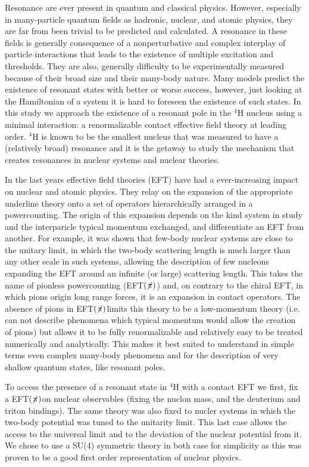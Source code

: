 \documentclass[aps,onecolumn,preprintnumbers,amsmath,amssymb,nofootinbib,superscriptaddress,notitlepage]{revtex4-1}
\newcommand{\eftnopi}{\mbox{EFT$(\not \! \pi)$}}
\begin{document}
Resonance are ever present in quantum and classical physics.
However, especially in many-particle quantum fields as hadronic, nuclear, and atomic physics, they are far from been trivial to be predicted and calculated. 
A resonance in these fields is generally consequence of a nonperturbative and complex interplay of particle interactions that leads to the existence of multiple excitation and thresholds. 
They are also, generally difficulty to be experimentally measured because of their broad size and their many-body nature. 
Many models predict the existence of resonant states with better or worse success, however, just looking at the Hamiltonian of a system it is hard to foreseen the existence of such states.
In this study we approach the existence of a resonant pole in the $^4$H nucleus using a minimal interaction: a renormalizable contact effective field theory at leading order.
$^4$H is known to be the smallest nucleus that was measured to have a (relatively broad) resonance and it is the getaway to study the mechanism that creates resonances in nuclear systems and nuclear theories.

In the last years effective field theories (EFT) have had a ever-increasing impact on nuclear and atomic physics. 
They relay on the expansion of the appropriate underline theory onto a set of operators hierarchically arranged in a powercounting. 
The origin of this expansion depends on the kind system in study and the interparicle typical momentum exchanged, and differentiate an EFT from another. 
For example, it was shown that few-body nuclear systems are close to the unitary limit, in which the two-body scattering length is much larger than any other scale in such systems, allowing the description of few nucleons expanding the EFT around an infinite (or large) scattering length.
This takes the name of pionless powercounting (\eftnopi) and, on contrary to the chiral EFT, in which pions origin long range forces, it is an expansion in contact operators.
The absence of pions in \eftnopi limits this theory to be a low-momentum theory (i.e. can not describe phenomena which typical momentum would allow the creation of pions) but allows it to be fully renormalizable and relatively easy to be treated numerically and analytically.
This makes it best suited to understand in simple terms even complex many-body phenomena and for the description of very shallow quantum states, like resonant poles. 

To access the presence of a resonant state in $^4$H with a contact EFT we first, fix a \eftnopi on nuclear observables (fixing the nuclon mass, and the deuterium and triton bindings).
The same theory was also fixed to nucler systems in which the two-body potential was tuned to the unitarity limit.
This last case allows the access to the universal limit and to the deviation of the nuclear potential from it.
We chose to use a SU(4) symmetric theory in both case for simplicity as this was proven to be a good first order representation of nuclear physics\cite{}. 
\end{document}
